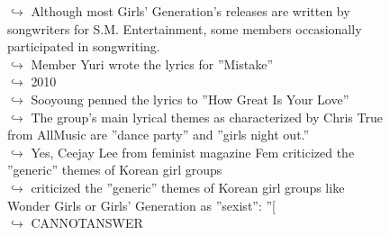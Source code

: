 \documentclass[11pt,a4paper, onecolumn]{article}
\begin{document}
\begin{figure}[t] \small \begin{tcolorbox}[boxsep=0pt,left=5pt,right=0pt,top=2pt,colback = yellow!5] \begin{dialogue}
 \small 
\colorbox{pink!25}{$\hookrightarrow$}
{ Although most Girls' Generation's releases are written by songwriters for S.M. Entertainment, some members occasionally participated in songwriting. }
\\
\colorbox{pink!25}{$\hookrightarrow$}
{ Member Yuri wrote the lyrics for ''Mistake'' }
\\
\colorbox{pink!25}{$\hookrightarrow$}
{ 2010 }
\\
\colorbox{pink!25}{$\hookrightarrow$}
{ Sooyoung penned the lyrics to ''How Great Is Your Love'' }
\\
\colorbox{pink!25}{$\hookrightarrow$}
{ The group's main lyrical themes as characterized by Chris True from AllMusic are ''dance party'' and ''girls night out.'' }
\\
\colorbox{pink!25}{$\hookrightarrow$}
\colorbox{red!25}{Yes,}
{ Ceejay Lee from feminist magazine Fem criticized the ''generic'' themes of Korean girl groups }
\\
\colorbox{pink!25}{$\hookrightarrow$}
{ criticized the ''generic'' themes of Korean girl groups like Wonder Girls or Girls' Generation as ''sexist'': ''[ }
\\
\colorbox{pink!25}{$\hookrightarrow$}
{ CANNOTANSWER }
 \end{dialogue}\end{tcolorbox}\end{figure}\begin{figure}[t] \small \begin{tcolorbox}[boxsep=0pt,left=5pt,right=0pt,top=2pt,colback = yellow!5] \begin{dialogue}
 \small 

\end{dialogue}
\end{tcolorbox}
\end{figure}
\end{document}
